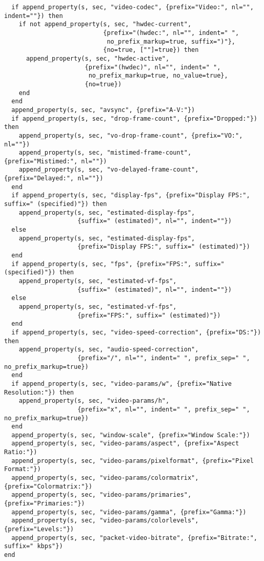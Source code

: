 \documentclass[11pt]{article}
\begin{document}
\begin{lstlisting}
  if append_property(s, sec, "video-codec", {prefix="Video:", nl="", indent=""}) then
    if not append_property(s, sec, "hwdec-current",
                           {prefix="(hwdec:", nl="", indent=" ",
                            no_prefix_markup=true, suffix=")"},
                           {no=true, [""]=true}) then
      append_property(s, sec, "hwdec-active",
                      {prefix="(hwdec)", nl="", indent=" ",
                       no_prefix_markup=true, no_value=true},
                      {no=true})
    end
  end
  append_property(s, sec, "avsync", {prefix="A-V:"})
  if append_property(s, sec, "drop-frame-count", {prefix="Dropped:"}) then
    append_property(s, sec, "vo-drop-frame-count", {prefix="VO:", nl=""})
    append_property(s, sec, "mistimed-frame-count", {prefix="Mistimed:", nl=""})
    append_property(s, sec, "vo-delayed-frame-count", {prefix="Delayed:", nl=""})
  end
  if append_property(s, sec, "display-fps", {prefix="Display FPS:", suffix=" (specified)"}) then
    append_property(s, sec, "estimated-display-fps",
                    {suffix=" (estimated)", nl="", indent=""})
  else
    append_property(s, sec, "estimated-display-fps",
                    {prefix="Display FPS:", suffix=" (estimated)"})
  end
  if append_property(s, sec, "fps", {prefix="FPS:", suffix=" (specified)"}) then
    append_property(s, sec, "estimated-vf-fps",
                    {suffix=" (estimated)", nl="", indent=""})
  else
    append_property(s, sec, "estimated-vf-fps",
                    {prefix="FPS:", suffix=" (estimated)"})
  end
  if append_property(s, sec, "video-speed-correction", {prefix="DS:"}) then
    append_property(s, sec, "audio-speed-correction",
                    {prefix="/", nl="", indent=" ", prefix_sep=" ", no_prefix_markup=true})
  end
  if append_property(s, sec, "video-params/w", {prefix="Native Resolution:"}) then
    append_property(s, sec, "video-params/h",
                    {prefix="x", nl="", indent=" ", prefix_sep=" ", no_prefix_markup=true})
  end
  append_property(s, sec, "window-scale", {prefix="Window Scale:"})
  append_property(s, sec, "video-params/aspect", {prefix="Aspect Ratio:"})
  append_property(s, sec, "video-params/pixelformat", {prefix="Pixel Format:"})
  append_property(s, sec, "video-params/colormatrix", {prefix="Colormatrix:"})
  append_property(s, sec, "video-params/primaries", {prefix="Primaries:"})
  append_property(s, sec, "video-params/gamma", {prefix="Gamma:"})
  append_property(s, sec, "video-params/colorlevels", {prefix="Levels:"})
  append_property(s, sec, "packet-video-bitrate", {prefix="Bitrate:", suffix=" kbps"})
end


\end{lstlisting}
\end{document}
